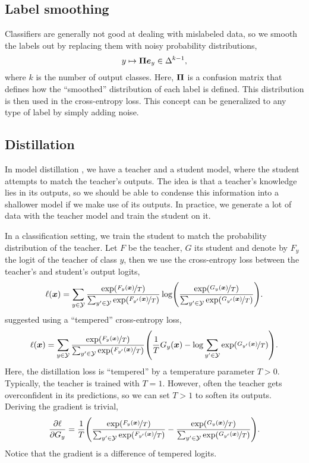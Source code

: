 \subsection{Label smoothing}

Classifiers are generally not good at dealing with mislabeled data, so we smooth the labels out by
replacing them with noisy probability distributions, \[
    y \mapsto \bm{\Pi} \bm{e}_y \in \Delta^{k-1},
\]
where $k$ is the number of output classes. Here, $\bm{\Pi}$ is a confusion matrix that defines how
the ``smoothed'' distribution of each label is defined. This distribution is then used in the
cross-entropy loss. This concept can be generalized to any type of label by simply adding noise.

\subsection{Distillation}

In model distillation \citep{hinton2015distilling}, we have a teacher and a student model, where
the student attempts to match the teacher's outputs. The idea is that a teacher's knowledge lies in
its outputs, so we should be able to condense this information into a shallower model if we make
use of its outputs. In practice, we generate a lot of data with the teacher model and train the
student on it.

In a classification setting, we train the student to match the probability distribution of the
teacher. Let $F$ be the teacher, $G$ its student and denote by $F_y$ the logit of the teacher of
class $y$, then we use the cross-entropy loss between the teacher's and student's output logits, \[
    \ell(\vec{x}) = \sum_{y\in \mathcal{Y}} \frac{\exp(\nicefrac{F_y(\vec{x})}{T})}{\sum_{y'\in \mathcal{Y}} \exp(\nicefrac{F_{y'}(\vec{x})}{T})} \log \lft( \frac{\exp(\nicefrac{G_{y}(\vec{x})}{T})}{\sum_{y' \in \mathcal{Y}} \exp(\nicefrac{G_{y'}(\vec{x})}{T})} \rgt).
\]
\citet{hinton2015distilling} suggested using a ``tempered'' cross-entropy loss, \[
    \ell(\vec{x}) = \sum_{y\in \mathcal{Y}} \frac{\exp(\nicefrac{F_y(\vec{x})}{T})}{\sum_{y'\in \mathcal{Y}} \exp(\nicefrac{F_{y'}(\vec{x})}{T})} \lft( \frac{1}{T} G_y(\vec{x}) - \log \sum_{y' \in \mathcal{Y}} \exp(\nicefrac{G_{y'}(\vec{x})}{T}) \rgt).
\]
Here, the distillation loss is ``tempered'' by a temperature parameter $T > 0$. Typically, the
teacher is trained with $T = 1$. However, often the teacher gets overconfident in its predictions,
so we can set $T > 1$ to soften its outputs. Deriving the gradient is trivial, \[
    \pdv{\ell}{G_y} = \frac{1}{T} \lft( \frac{\exp(\nicefrac{F_y(\vec{x})}{T})}{\sum_{y' \in \mathcal{Y}} \exp(\nicefrac{F_{y'}(\vec{x})}{T})} - \frac{\exp(\nicefrac{G_y(\vec{x})}{T})}{\sum_{y' \in \mathcal{Y}} \exp(\nicefrac{G_{y'}(\vec{x})}{T})} \rgt).
\]
Notice that the gradient is a difference of tempered logits.

